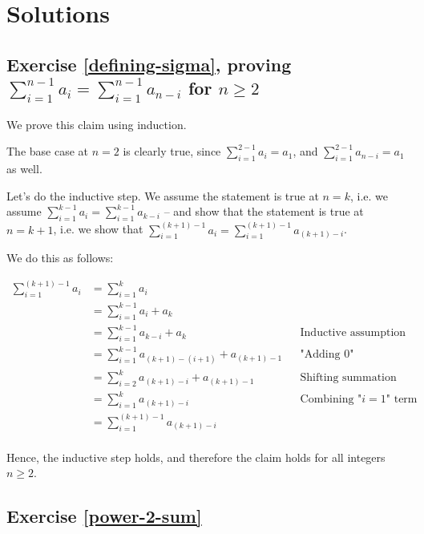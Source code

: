 \documentclass{article}
\begin{document}
\section{Solutions}


\subsection{Exercise \ref{defining-sigma}, proving $\sum_{i=1}^{n-1} a_i = \sum_{i=1}^{n-1} a_{n-i}$ for $n \geq 2$}

We prove this claim using induction. 

The base case at $n = 2$ is clearly true, since $\sum_{i=1}^{2-1} a_i = a_1$, and $\sum_{i=1}^{2-1} a_{n-i} = a_1$ as well. 

Let's do the inductive step. We assume the statement is true at $n = k$, i.e. we assume $\sum_{i=1}^{k-1} a_i = \sum_{i=1}^{k-1} a_{k-i}$ -- and show that the statement is true at $n = k + 1$, i.e. we show that $\sum_{i=1}^{(k+1)-1} a_i = \sum_{i=1}^{(k+1)-1} a_{(k+1)-i}$.

We do this as follows:

\begin{align*}
\sum_{i=1}^{(k+1)-1} a_i &= \sum_{i=1}^{k} a_i \\
&= \sum_{i=1}^{k-1} a_i + a_k \\
&= \sum_{i=1}^{k-1} a_{k-i} + a_k && \text{Inductive assumption} \\
&= \sum_{i=1}^{k-1} a_{(k+1)-(i+1)} + a_{(k+1)-1} && \text{"Adding 0"} \\
&= \sum_{i=2}^{k} a_{(k+1)-i} + a_{(k+1)-1} && \text{Shifting summation index} \\
&= \sum_{i=1}^{k} a_{(k+1)-i} && \text{Combining "$i = 1$" term} \\
&= \sum_{i=1}^{(k+1)-1} a_{(k+1)-i} \\
\end{align*}

Hence, the inductive step holds, and therefore the claim holds for all integers $n \geq 2$. 



\subsection{Exercise \ref{power-2-sum}}
\end{document}
